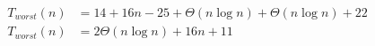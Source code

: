 \begin{subequations}
\label{eq:analyse-checksquare-all}
\begin{align}
\label{eq:analyse-checksquare-all-1}
T_{worst}(n)& =
14 + 16n - 25 + \Theta(n \log n) + \Theta(n \log n) + 22
\\
\label{eq:analyse-checksquare-all-2}
T_{worst}(n)& =
2 \Theta(n \log n) + 16n + 11
\end{align}	
\end{subequations}
